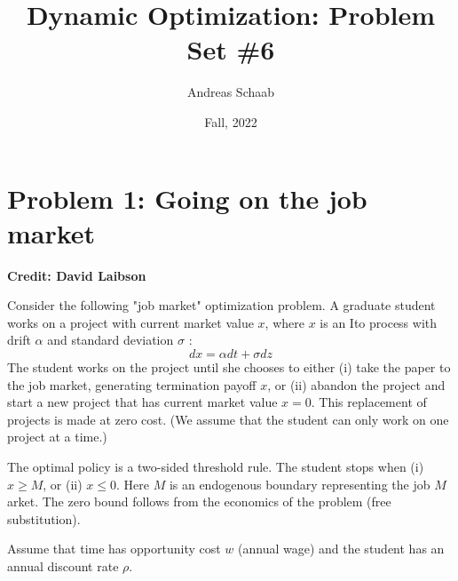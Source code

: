 \documentclass[11pt]{extarticle}
\title{Dynamic Optimization: Problem Set \#6}
\author{Andreas Schaab}
\date{Fall, 2022}
\theoremstyle{plain}
\theoremstyle{definition}
\begin{document}
\maketitle
\thispagestyle{empty}
\setcounter{page}{0}


\vspace{10mm}
\section*{Problem 1: Going on the job market}

\textbf{Credit: David Laibson} 

Consider the following "job market" optimization problem.
A graduate student works on a project with current market value $x$, where $x$ is an Ito process with drift $\alpha$ and standard deviation $\sigma$ :
$$
d x=\alpha d t+\sigma d z
$$
The student works on the project until she chooses to either (i) take the paper to the job market, generating termination payoff $x$, or (ii) abandon the project and start a new project that has current market value $x=0$. This replacement of projects is made at zero cost. (We assume that the student can only work on one project at a time.)

The optimal policy is a two-sided threshold rule. The student stops when (i) $x \geq M$, or (ii) $x \leq 0$. Here $M$ is an endogenous boundary representing the job $M$ arket. The zero bound follows from the economics of the problem (free substitution).

Assume that time has opportunity cost $w$ (annual wage) and the student has an annual discount rate $\rho$.
\end{document}
